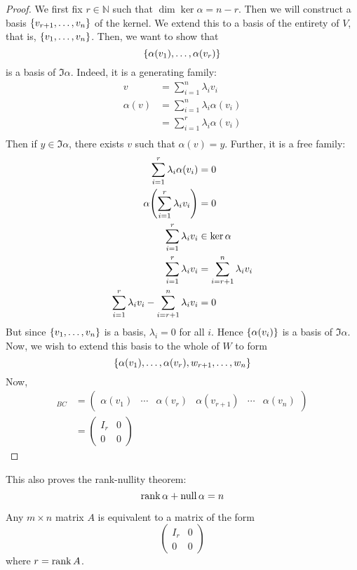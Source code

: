 \begin{proof}
	We first fix \( r \in \mathbb N \) such that \( \dim \ker \alpha = n - r \).
	Then we will construct a basis \( \qty{v_{r+1}, \dots, v_n} \) of the kernel.
	We extend this to a basis of the entirety of \( V \), that is, \( \qty{v_1,\dots,v_n} \).
	Then, we want to show that
	\[
		\qty{\alpha(v_1), \dots, \alpha(v_r)}
	\]
	is a basis of \( \Im \alpha \).
	Indeed, it is a generating family:
	\begin{align*}
		v         & = \sum_{i=1}^n \lambda_i v_i         \\
		\alpha(v) & = \sum_{i=1}^n \lambda_i \alpha(v_i) \\
		          & = \sum_{i=1}^r \lambda_i \alpha(v_i) \\
	\end{align*}
	Then if \( y \in \Im \alpha \), there exists \( v \) such that \( \alpha(v) = y \).
	Further, it is a free family:
	\begin{align*}
		\sum_{i=1}^r \lambda_i \alpha(v_i)                        & = 0                            \\
		\alpha\qty(\sum_{i=1}^r \lambda_i v_i)                    & = 0                            \\
		\sum_{i=1}^r \lambda_i v_i                                & \in \ker \alpha                \\
		\sum_{i=1}^r \lambda_i v_i                                & = \sum_{i=r+1}^n \lambda_i v_i \\
		\sum_{i=1}^r \lambda_i v_i - \sum_{i=r+1}^n \lambda_i v_i & = 0                            \\
	\end{align*}
	But since \( \qty{v_1, \dots, v_n} \) is a basis, \( \lambda_i = 0 \) for all \( i \).
	Hence \( \qty{\alpha(v_i)} \) is a basis of \( \Im \alpha \).
	Now, we wish to extend this basis to the whole of \( W \) to form
	\[
		\qty{\alpha(v_1), \dots, \alpha(v_r), w_{r+1}, \dots, w_n}
	\]
	Now,
	\begin{align*}
		[\alpha]_{BC} & = \begin{pmatrix}
			\alpha(v_1) & \cdots & \alpha(v_r) & \alpha(v_{r+1}) & \cdots & \alpha(v_n)
		\end{pmatrix} \\
		              & = \begin{pmatrix}
			I_r & 0 \\
			0   & 0
		\end{pmatrix}
	\end{align*}
\end{proof}
\begin{remark}
	This also proves the rank-nullity theorem:
	\[
		\rank \alpha + \operatorname{null} \alpha = n
	\]
\end{remark}
\begin{corollary}
	Any \( m \times n \) matrix \( A \) is equivalent to a matrix of the form
	\[
		\begin{pmatrix}
			I_r & 0 \\
			0   & 0
		\end{pmatrix}
	\]
	where \( r = \rank A \).
\end{corollary}

